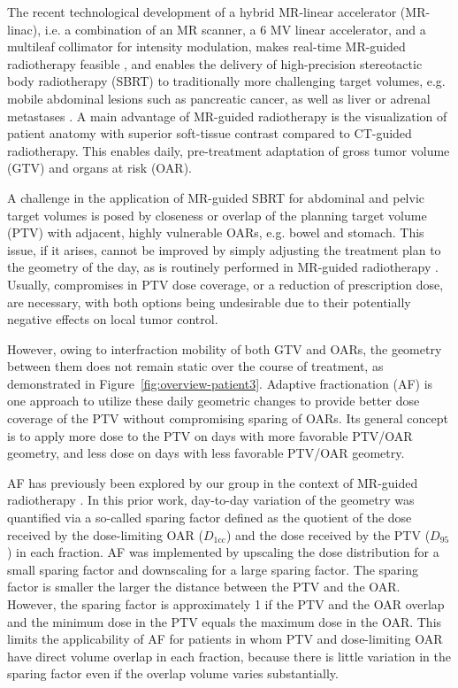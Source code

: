 \documentclass[11pt]{article}
\begin{document}
The recent technological development of a hybrid MR-linear accelerator (MR-linac), i.e. a combination of an MR scanner, a 6 MV linear accelerator, and a multileaf collimator for intensity modulation, makes real-time MR-guided radiotherapy feasible \cite{ref1,ref2,ref3,ref4}, and enables the delivery of high-precision stereotactic body radiotherapy (SBRT) to traditionally more challenging target volumes, e.g. mobile abdominal lesions such as pancreatic cancer, as well as liver or adrenal metastases \cite{ref5,ref6,ref7,ref8}. A main advantage of MR-guided radiotherapy is the visualization of patient anatomy with superior soft-tissue contrast compared to CT-guided radiotherapy. This enables daily, pre-treatment adaptation of gross tumor volume (GTV) and organs at risk (OAR).

A challenge in the application of MR-guided SBRT for abdominal and pelvic target volumes is posed by closeness or overlap of the planning target volume (PTV) with adjacent, highly vulnerable OARs, e.g. bowel and stomach. This issue, if it arises, cannot be improved by simply adjusting the treatment plan to the geometry of the day, as is routinely performed in MR-guided radiotherapy \cite{ref9}. Usually, compromises in PTV dose coverage, or a reduction of prescription dose, are necessary, with both options being undesirable due to their potentially negative effects on local tumor control.

However, owing to interfraction mobility of both GTV and OARs, the geometry between them does not remain static over the course of treatment, as demonstrated in Figure~\ref{fig:overview-patient3}. Adaptive fractionation (AF) \cite{ref10,ref11,ref12} is one approach to utilize these daily geometric changes to provide better dose coverage of the PTV without compromising sparing of OARs. Its general concept is to apply more dose to the PTV on days with more favorable PTV/OAR geometry, and less dose on days with less favorable PTV/OAR geometry.

AF has previously been explored by our group in the context of MR-guided radiotherapy \cite{ref13}. In this prior work, day-to-day variation of the geometry was quantified via a so-called sparing factor defined as the quotient of the dose received by the dose-limiting OAR ($D_{1\mathrm{cc}}$) and the dose received by the PTV ($D_{95}$) in each fraction. AF was implemented by upscaling the dose distribution for a small sparing factor and downscaling for a large sparing factor. The sparing factor is smaller the larger the distance between the PTV and the OAR. However, the sparing factor is approximately 1 if the PTV and the OAR overlap and the minimum dose in the PTV equals the maximum dose in the OAR. This limits the applicability of AF for patients in whom PTV and dose-limiting OAR have direct volume overlap in each fraction, because there is little variation in the sparing factor even if the overlap volume varies substantially.
\end{document}
